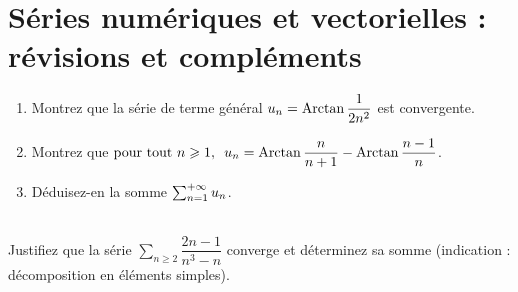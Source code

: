 \chapter{Séries numériques et vectorielles : révisions et compléments}

\legendeexercices

\begin{exos}[Exercice 1]
\begin{enumerate}
    \item Montrez que la série de terme général \(u_n=\operatorname{Arctan}\dfrac{1}{2n^2}\) est convergente. \\
    \item Montrez que \(\quantifs{\tpt n\geq1}u_n=\Arctan\dfrac{n}{n+1}-\Arctan\dfrac{n-1}{n}\). \\
    \item Déduisez-en la somme \(\sum_{n=1}^{+\infty}u_n\).
\end{enumerate}
\end{exos}



\begin{exos}[Exercice 2]~\\
Justifiez que la série \(\sum_{n\geq2}\dfrac{2n-1}{n^3-n}\) converge et déterminez sa somme (indication : décomposition en éléments simples).
\end{exos}



